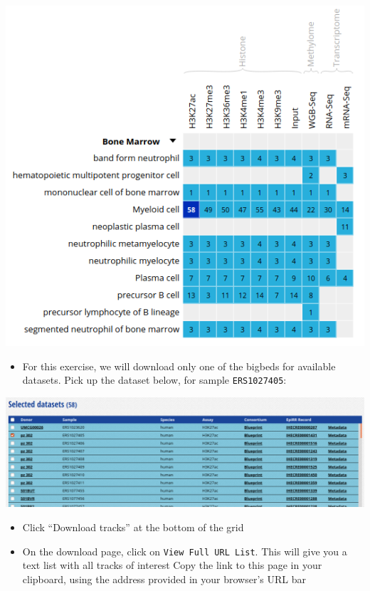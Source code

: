 \documentclass[
]{book}
\providecommand{\tightlist}{%
  \setlength{\itemsep}{0pt}\setlength{\parskip}{0pt}}
\begin{document}
\includegraphics{./img/GREAT_bone_marrow_h3k27ac.png}

\begin{itemize}
\tightlist
\item
  For this exercise, we will download only one of the bigbeds for available datasets. Pick up the dataset below, for sample \texttt{ERS1027405}:
\end{itemize}

\includegraphics{./img/GREAT_selectSomeBoneMarrowDatasets.png}

\begin{itemize}
\item
  Click ``Download tracks'' at the bottom of the grid
\item
  On the download page, click on \texttt{View\ Full\ URL\ List}. This will give you a text list with all tracks of interest Copy the link to this page in your clipboard, using the address provided in your browser's URL bar
\end{itemize}
\end{document}
